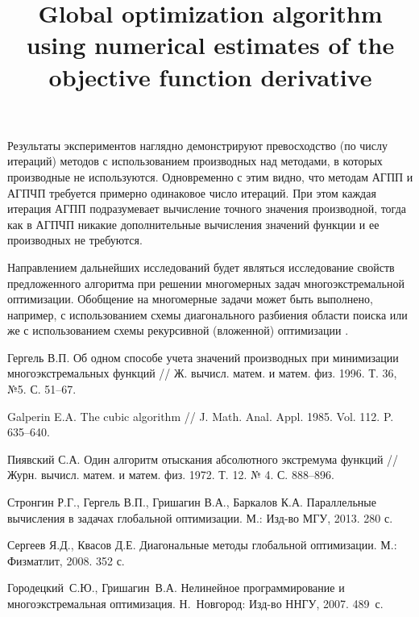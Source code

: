 \documentclass[11pt, oneside, a4paper]{article}
\begin{document}
Результаты экспериментов наглядно демонстрируют превосходство (по числу итераций) методов с использованием производных над методами, в которых производные не используются. Одновременно с этим видно, что методам АГПП и АГПЧП требуется примерно одинаковое число итераций. При этом каждая итерация АГПП подразумевает вычисление точного значения производной, тогда как в АГПЧП никакие дополнительные вычисления значений функции и ее производных не требуются.

Направлением дальнейших исследований будет являться исследование свойств предложенного алгоритма при решении многомерных задач многоэкстремальной оптимизации. Обобщение на многомерные задачи может быть выполнено, например, с использованием схемы диагонального разбиения области поиска \cite{Sergeyev2008} или же с использованием схемы рекурсивной (вложенной) оптимизации \cite{Grishagin2007}.


\begin{biblio}





Гергель В.П. Об одном способе учета значений производных при минимизации многоэкстремальных функций // Ж. вычисл. матем. и матем. физ. 1996. Т. 36, №5. С. 51--67.

Galperin E.A. The cubic algorithm // J. Math. Anal. Appl. 1985. Vol. 112. P. 635--640.

Пиявский С.А. Один алгоритм отыскания абсолютного экстремума функций // Журн. вычисл. матем. и матем. физ. 1972. Т. 12. № 4. С. 888--896.

Стронгин Р.Г., Гергель В.П., Гришагин В.А., Баркалов К.А. Параллельные вычисления в задачах глобальной оптимизации. М.: Изд-во МГУ, 2013. 280 с.

 Сергеев Я.Д., Квасов Д.Е. Диагональные методы глобальной оптимизации. М.: Физматлит, 2008. 352 с. 

 Городецкий~С.Ю., Гришагин~В.А. Нелинейное программирование и многоэкстремальная оптимизация. Н.~Новгород: Изд-во ННГУ, 2007. 489~с.




\end{biblio}


\title{Global optimization algorithm using numerical estimates of the objective function derivative}

\end{document}
